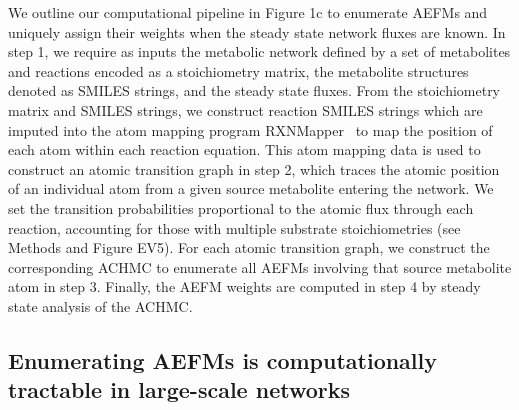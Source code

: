 \documentclass[12pt]{article}
\begin{document}
We outline our computational pipeline in Figure 1c to enumerate AEFMs and
uniquely assign their weights when the steady state network fluxes are
known. In step 1, we require as inputs the metabolic network defined by
a set of metabolites and reactions encoded as a stoichiometry matrix, the
metabolite structures denoted as SMILES strings, and the steady state
fluxes. From the stoichiometry matrix and SMILES strings, we construct
reaction SMILES strings which are imputed into the atom mapping program
RXNMapper~\citep{Schwaller2021extraction} to map the position of each atom
within each reaction equation. This atom mapping data is used to construct
an atomic transition graph in step 2, which traces the atomic position of
an individual atom from a given source metabolite entering the network. We
set the transition probabilities proportional to the atomic flux through
each reaction, accounting for those with multiple substrate
stoichiometries (see Methods and Figure EV5).
For each atomic transition graph, we construct the corresponding ACHMC to
enumerate all AEFMs involving that source metabolite atom in step 3.
Finally, the AEFM weights are computed in step 4 by steady state analysis
of the ACHMC. 

\subsection*{Enumerating AEFMs is computationally tractable in large-scale networks}
\end{document}
